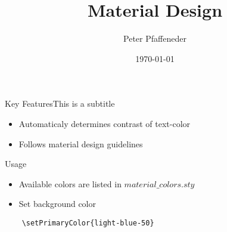 \documentclass{beamer}
\title{Material Design}
\date{\today}
\author{Peter Pfaffeneder}
\begin{document}
\begin{frame}
	\titlepage
\end{frame}

\begin{frame}{Key Features}{This is a subtitle}

	\begin{itemize}
		\item Automaticaly determines contrast of text-color
		\item Follows material design guidelines
	\end{itemize}
\end{frame}

\begin{frame}{Usage}
	\begin{itemize}
		\item Available colors are listed in $material\_colors.sty$
		\item Set background color
	\end{itemize}
\end{frame}


\begin{verbatim}
	\setPrimaryColor{light-blue-50}
\end{verbatim}
\end{document}
